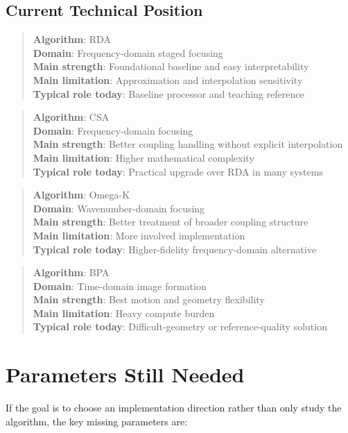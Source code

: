 \documentclass[journal,onecolumn]{IEEEtran}
\begin{document}
\subsection{Current Technical Position}
\begin{quote}
\textbf{Algorithm}: RDA\\
\textbf{Domain}: Frequency-domain staged focusing\\
\textbf{Main strength}: Foundational baseline and easy interpretability\\
\textbf{Main limitation}: Approximation and interpolation sensitivity\\
\textbf{Typical role today}: Baseline processor and teaching reference\\
\end{quote}
\begin{quote}
\textbf{Algorithm}: CSA\\
\textbf{Domain}: Frequency-domain focusing\\
\textbf{Main strength}: Better coupling handling without explicit interpolation\\
\textbf{Main limitation}: Higher mathematical complexity\\
\textbf{Typical role today}: Practical upgrade over RDA in many systems\\
\end{quote}
\begin{quote}
\textbf{Algorithm}: Omega-K\\
\textbf{Domain}: Wavenumber-domain focusing\\
\textbf{Main strength}: Better treatment of broader coupling structure\\
\textbf{Main limitation}: More involved implementation\\
\textbf{Typical role today}: Higher-fidelity frequency-domain alternative\\
\end{quote}
\begin{quote}
\textbf{Algorithm}: BPA\\
\textbf{Domain}: Time-domain image formation\\
\textbf{Main strength}: Best motion and geometry flexibility\\
\textbf{Main limitation}: Heavy compute burden\\
\textbf{Typical role today}: Difficult-geometry or reference-quality solution\\
\end{quote}
\section{Parameters Still Needed}
If the goal is to choose an implementation direction rather than only study the algorithm, the key missing parameters are:
\end{document}

